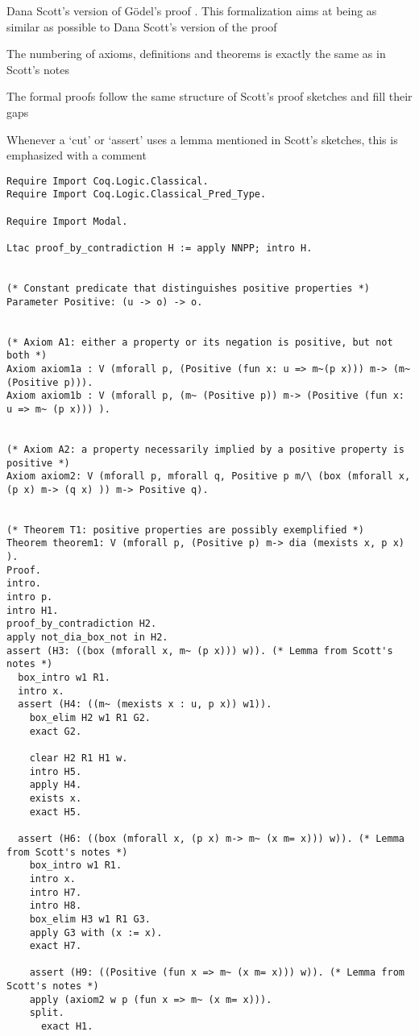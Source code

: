 \documentclass{llncs}
\begin{document}
Dana Scott's version of G\"odel's proof \cite{ScottNotes}. This formalization aims at
being as similar as possible to Dana Scott's version of the proof 

The numbering of axioms, definitions and theorems is exactly the same as in Scott's notes

The formal proofs follow the same structure of Scott's proof sketches and fill their gaps

Whenever a `cut' or `assert' uses a lemma mentioned in Scott's sketches,
this is emphasized with a comment 

\begin{verbatim}
Require Import Coq.Logic.Classical.
Require Import Coq.Logic.Classical_Pred_Type.

Require Import Modal.

Ltac proof_by_contradiction H := apply NNPP; intro H.


(* Constant predicate that distinguishes positive properties *)
Parameter Positive: (u -> o) -> o.


(* Axiom A1: either a property or its negation is positive, but not both *)
Axiom axiom1a : V (mforall p, (Positive (fun x: u => m~(p x))) m-> (m~ (Positive p))).
Axiom axiom1b : V (mforall p, (m~ (Positive p)) m-> (Positive (fun x: u => m~ (p x))) ).


(* Axiom A2: a property necessarily implied by a positive property is positive *)
Axiom axiom2: V (mforall p, mforall q, Positive p m/\ (box (mforall x, (p x) m-> (q x) )) m-> Positive q).


(* Theorem T1: positive properties are possibly exemplified *)
Theorem theorem1: V (mforall p, (Positive p) m-> dia (mexists x, p x) ).
Proof.
intro.
intro p.
intro H1.
proof_by_contradiction H2.
apply not_dia_box_not in H2.
assert (H3: ((box (mforall x, m~ (p x))) w)). (* Lemma from Scott's notes *)
  box_intro w1 R1.
  intro x.
  assert (H4: ((m~ (mexists x : u, p x)) w1)).
    box_elim H2 w1 R1 G2. 
    exact G2.

    clear H2 R1 H1 w.
    intro H5.
    apply H4.
    exists x.
    exact H5.

  assert (H6: ((box (mforall x, (p x) m-> m~ (x m= x))) w)). (* Lemma from Scott's notes *)    
    box_intro w1 R1.
    intro x.
    intro H7.
    intro H8.
    box_elim H3 w1 R1 G3.
    apply G3 with (x := x).
    exact H7.

    assert (H9: ((Positive (fun x => m~ (x m= x))) w)). (* Lemma from Scott's notes *)
    apply (axiom2 w p (fun x => m~ (x m= x))).
    split.
      exact H1.


\end{verbatim}
\end{document}
